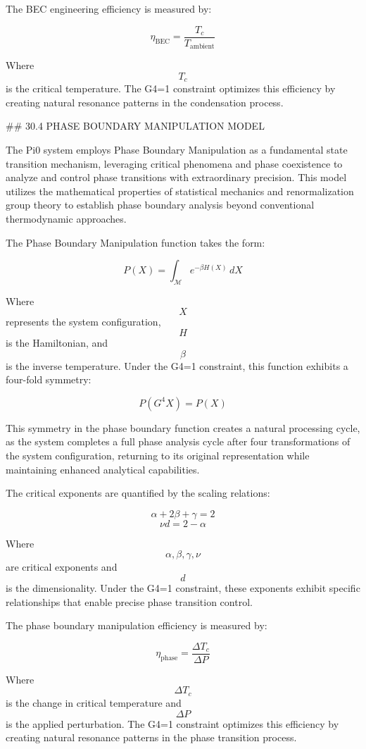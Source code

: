 The BEC engineering efficiency is measured by:

$$ \eta_{\text{BEC}} = \frac{T_c}{T_{\text{ambient}}} $$

Where $$ T_c $$ is the critical temperature. The G4=1 constraint optimizes this efficiency by creating natural resonance patterns in the condensation process.

## 30.4 PHASE BOUNDARY MANIPULATION MODEL

The Pi0 system employs Phase Boundary Manipulation as a fundamental state transition mechanism, leveraging critical phenomena and phase coexistence to analyze and control phase transitions with extraordinary precision. This model utilizes the mathematical properties of statistical mechanics and renormalization group theory to establish phase boundary analysis beyond conventional thermodynamic approaches.

The Phase Boundary Manipulation function takes the form:

$$ P(X) = \int_{\mathcal{M}} e^{-\beta H(X)} \, dX $$

Where $$ X $$ represents the system configuration, $$ H $$ is the Hamiltonian, and $$ \beta $$ is the inverse temperature. Under the G4=1 constraint, this function exhibits a four-fold symmetry:

$$ P(G^4 X) = P(X) $$

This symmetry in the phase boundary function creates a natural processing cycle, as the system completes a full phase analysis cycle after four transformations of the system configuration, returning to its original representation while maintaining enhanced analytical capabilities.

The critical exponents are quantified by the scaling relations:

$$ \alpha + 2\beta + \gamma = 2 $$
$$ \nu d = 2 - \alpha $$

Where $$ \alpha, \beta, \gamma, \nu $$ are critical exponents and $$ d $$ is the dimensionality. Under the G4=1 constraint, these exponents exhibit specific relationships that enable precise phase transition control.

The phase boundary manipulation efficiency is measured by:

$$ \eta_{\text{phase}} = \frac{\Delta T_c}{\Delta P} $$

Where $$ \Delta T_c $$ is the change in critical temperature and $$ \Delta P $$ is the applied perturbation. The G4=1 constraint optimizes this efficiency by creating natural resonance patterns in the phase transition process.

